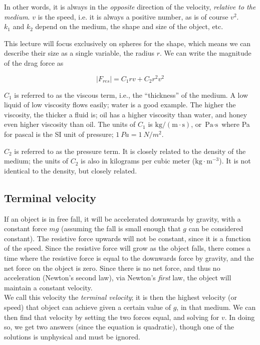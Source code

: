In other words, it is always in the \emph{opposite} direction of the velocity, \emph{relative to the medium}. $v$ is the speed, i.e. it is always a positive number, as is of course $v^2$.\\
$k_1$ and $k_2$ depend on the medium, the shape and size of the object, etc.

This lecture will focus exclusively on spheres for the shape, which means we can describe their size as a single variable, the radius $r$. We can write the magnitude of the drag force as

\begin{equation}
|F_{res}| = C_1 r v + C_2 r^2 v^2
\end{equation}

$C_1$ is referred to as the viscous term, i.e., the ``thickness'' of the medium. A low liquid of low viscosity flows easily; water is a good example. The higher the viscosity, the thicker a fluid is; oil has a higher viscosity than water, and honey even higher viscosity than oil. The units of $C_1$ is $\text{kg}/(\text{m} \cdot \text{s})$, or $\text{Pa} \cdot \text{s}$ where Pa for pascal is the SI unit of pressure; $\SI{1}{Pa} = \SI{1}{N/m^2}$.

$C_2$ is referred to as the pressure term. It is closely related to the density of the medium; the units of $C_2$ is also in kilograms per cubic meter ($\text{kg} \cdot \text{m}^{-3}$). It is not identical to the density, but closely related.

\subsection{Terminal velocity}

If an object is in free fall, it will be accelerated downwards by gravity, with a constant force $m g$ (assuming the fall is small enough that $g$ can be considered constant). The resistive force upwards will not be constant, since it is a function of the speed. Since the resistive force will grow as the object falls, there comes a time where the resistive force is equal to the downwards force by gravity, and the net force on the object is zero. Since there is no net force, and thus no acceleration (Newton's second law), via Newton's \emph{first} law, the object will maintain a constant velocity.\\
We call this velocity the \emph{terminal velocity}; it is then the highest velocity (or speed) that object can achieve given a certain value of $g$, in that medium. We can then find that velocity by setting the two forces equal, and solving for $v$. In doing so, we get two answers (since the equation is quadratic), though one of the solutions is unphysical and must be ignored.

